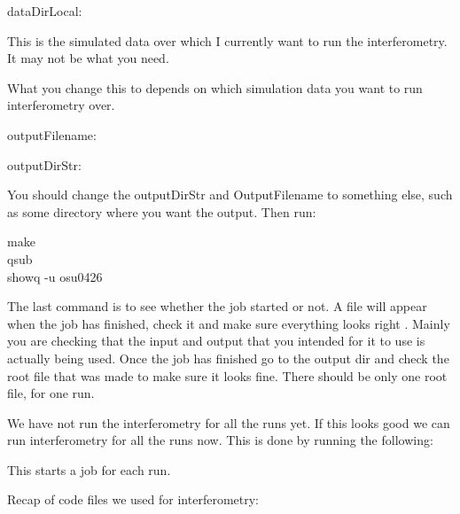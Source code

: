 \begin{center}
dataDirLocal: 
\end{center}

This is the simulated data over which I currently want to run the interferometry. It may not be what you need.

What you change this to depends on which simulation data you want to run interferometry over. 

\begin{center}
outputFilename: 
\end{center}

\begin{center}
outputDirStr: 
\end{center}

You should change the outputDirStr and OutputFilename to something else, such as some directory where you want the output.
Then run: 

\begin{center}
make \\
qsub \\
showq -u osu0426 
\end{center}


The last command is to see whether the job started or not. 
A  file will appear when the job has finished, check it and make sure everything looks right . Mainly you are checking that the input and output that you intended for it to use is actually being used. Once the job has finished go to the output dir and check the root file  that was made to make sure it looks fine. 
There should be only one root file, for one run. 

We have not run the interferometry for all the runs yet. 
If this looks good we can run interferometry for all the runs now.  This is done by running the following: 
\begin{center}
\end{center}

This starts a job for each run. 

Recap of code files we used for interferometry:  

\begin{center}
\\
\\
\end{center}

